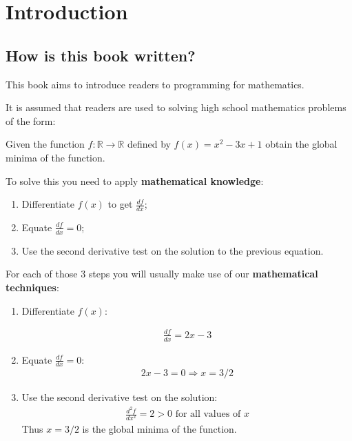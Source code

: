 \chapter{Introduction}

\section{How is this book written?}

This book aims to introduce readers to programming for mathematics.

It is assumed that readers are used to solving high school mathematics problems
of the form:


Given the function \(f:\mathbb{R}\to\mathbb{R}\) defined by
\(f(x) = x ^ 2 - 3 x + 1\) obtain the global minima of the function.


To solve this you need to apply \textbf{mathematical knowledge}:

\begin{enumerate}
    \item Differentiate \(f(x)\) to get \(\frac{df}{dx}\);
    \item Equate \(\frac{df}{dx}=0\);
    \item Use the second derivative test on the solution to the previous equation.
\end{enumerate}

For each of those 3 steps you will usually make use of our \textbf{mathematical
techniques}:
\begin{enumerate}
\item Differentiate \(f(x)\):

\begin{equation*}
\begin{split}\frac{df}{dx} = 2 x - 3\end{split}
\end{equation*}
\item Equate \(\frac{df}{dx}=0\):
\begin{equation*}
\begin{split}2x-3 =0 \Rightarrow x = 3/2\end{split}
\end{equation*}
\item Use the second derivative test on the solution:
\begin{equation*}
\begin{split}\frac{d^2f}{dx^2} = 2 > 0\text{ for all values of }x\end{split}
\end{equation*}
Thus \(x=3/2\) is the global minima of the function.

\end{enumerate}

